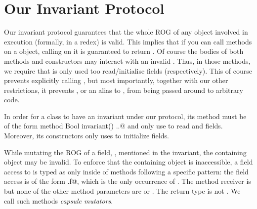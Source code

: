 







\section{Our Invariant Protocol}
\label{s:validate}
Our invariant protocol guarantees that the whole ROG of any object involved in execution (formally, in a redex) is valid.
This implies that if you can call methods on a object, calling \Q@invariant@ on it is guaranteed to return \Q@true@.
Of course the bodies of both \Q@invariant@ methods and constructors may interact with an invalid \Q@this@.
Thus, in those methods, we require that \Q@this@ is only used too read/initialise fields (respectively).
This of course prevents explicitly calling \Q@invariant@, but most importantly, together with our other restrictions, it prevents \Q@this@, or an alias to \Q@this@, from being passed around to arbitrary code.


In order for a class to have an invariant under our protocol,
its \Q@invariant@ method must be of the form \Q@read method Bool invariant() {..}@
and only use \Q@this@ to read \Q@imm@ and \Q@capsule@ fields.
Moreover, its constructors only uses \Q@this@ to initialize fields.

While mutating the ROG of a \Q@capsule@ field, \Q@f@, mentioned in the invariant, the containing object may be invalid.
To enforce that the containing object is inaccessible, 
a field access to \Q@f@ is typed as \Q@mut@ only inside of methods following a specific pattern:
 the field access is of the form \Q@this.f@, which is the only occurrence of \Q@this@.
 The method receiver is \Q@mut@ but none of the other method parameters are \Q@mut@ or \Q@read@.
 The return type is not \Q@mut@.
We call such methods \emph{capsule mutators}.


